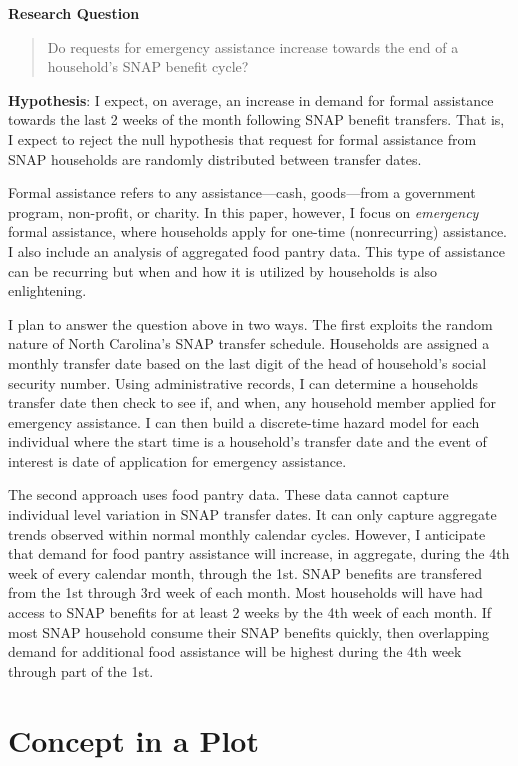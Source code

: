 \documentclass[12pt,letterpaperpaper,]{book}
\begin{document}
\textbf{Research Question}

\begin{quote}
Do requests for emergency assistance increase towards the end of a
household's SNAP benefit cycle?
\end{quote}

\textbf{Hypothesis}: I expect, on average, an increase in demand for
formal assistance towards the last 2 weeks of the month following SNAP
benefit transfers. That is, I expect to reject the null hypothesis that
request for formal assistance from SNAP households are randomly
distributed between transfer dates.

Formal assistance refers to any assistance---cash, goods---from a
government program, non-profit, or charity. In this paper, however, I
focus on \emph{emergency} formal assistance, where households apply for
one-time (nonrecurring) assistance. I also include an analysis of
aggregated food pantry data. This type of assistance can be recurring
but when and how it is utilized by households is also enlightening.

I plan to answer the question above in two ways. The first exploits the
random nature of North Carolina's SNAP transfer schedule. Households are
assigned a monthly transfer date based on the last digit of the head of
household's social security number. Using administrative records, I can
determine a households transfer date then check to see if, and when, any
household member applied for emergency assistance. I can then build a
discrete-time hazard model for each individual where the start time is a
household's transfer date and the event of interest is date of
application for emergency assistance.

The second approach uses food pantry data. These data cannot capture
individual level variation in SNAP transfer dates. It can only capture
aggregate trends observed within normal monthly calendar cycles.
However, I anticipate that demand for food pantry assistance will
increase, in aggregate, during the 4th week of every calendar month,
through the 1st. SNAP benefits are transfered from the 1st through 3rd
week of each month. Most households will have had access to SNAP
benefits for at least 2 weeks by the 4th week of each month. If most
SNAP household consume their SNAP benefits quickly, then overlapping
demand for additional food assistance will be highest during the 4th
week through part of the 1st.

\section*{Concept in a Plot}\label{concept-in-a-plot-2}
\end{document}
